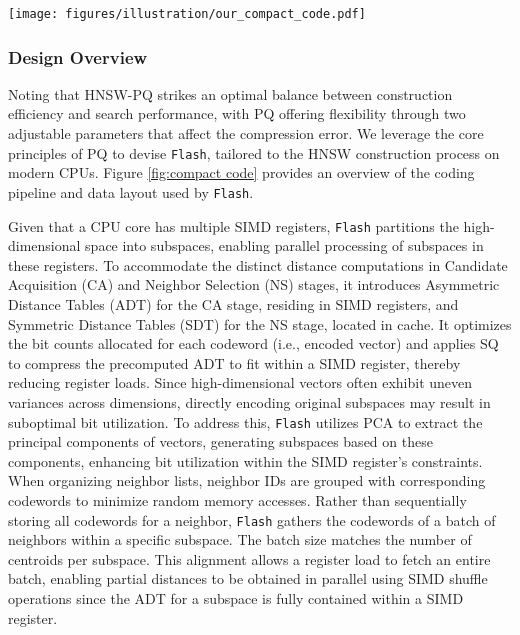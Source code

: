 \begin{figure*}
  \centering
  \setlength{\abovecaptionskip}{0cm}
  \setlength{\belowcaptionskip}{-0.1cm}
  \texttt{[image: figures/illustration/our\_compact\_code.pdf]}
  \caption{Illustrating the coding pipeline and data layout of \texttt{Flash}.}
  \label{fig:compact code}
  \vspace{-0.3cm}
\end{figure*}

\subsubsection{\textbf{Design Overview}}
\label{subsubsec: design overview}
Noting that HNSW-PQ strikes an optimal balance between construction efficiency and search performance, with PQ offering flexibility through two adjustable parameters that affect the compression error. We leverage the core principles of PQ to devise \texttt{Flash}, tailored to the HNSW construction process on modern CPUs. Figure \ref{fig:compact code} provides an overview of the coding pipeline and data layout used by \texttt{Flash}.

Given that a CPU core has multiple SIMD registers, \texttt{Flash} partitions the high-dimensional space into subspaces, enabling parallel processing of subspaces in these registers.
To accommodate the distinct distance computations in Candidate Acquisition (CA) and Neighbor Selection (NS) stages, it introduces Asymmetric Distance Tables (ADT) for the CA stage, residing in SIMD registers, and Symmetric Distance Tables (SDT) for the NS stage, located in cache. It optimizes the bit counts allocated for each codeword (i.e., encoded vector) and applies SQ to compress the precomputed ADT to fit within a SIMD register, thereby reducing register loads. Since high-dimensional vectors often exhibit uneven variances across dimensions, directly encoding original subspaces may result in suboptimal bit utilization. To address this, \texttt{Flash} utilizes PCA to extract the principal components of vectors, generating subspaces based on these components, enhancing bit utilization within the SIMD register's constraints.
When organizing neighbor lists, neighbor IDs are grouped with corresponding codewords to minimize random memory accesses. Rather than sequentially storing all codewords for a neighbor, \texttt{Flash} gathers the codewords of a batch of neighbors within a specific subspace. The batch size matches the number of centroids per subspace. This alignment allows a register load to fetch an entire batch, enabling partial distances to be obtained in parallel using SIMD shuffle operations since the ADT for a subspace is fully contained within a SIMD register.

